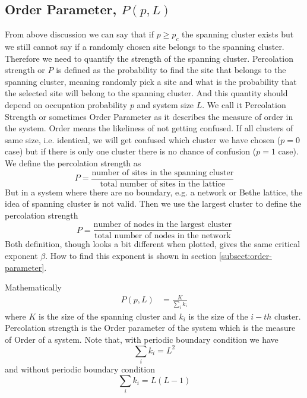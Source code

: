 	\subsection{Order Parameter, $P(p,L)$}
		From above discussion we can say that if $p\geq p_c$ the spanning cluster exists but we still cannot say if a randomly chosen site belongs to the spanning cluster. Therefore we need to quantify the strength of the spanning cluster. Percolation strength or $P$ is defined as the probability to find the site that belongs to the spanning cluster, meaning randomly pick a site and what is the probability that the selected site will belong to the spanning cluster. And this quantity should depend on occupation probability $p$ and system size $L$. We call it Percolation Strength or sometimes Order Parameter as it describes the measure of order in the system. Order means the likeliness of not getting confused. If all clusters of same size, i.e. identical, we will get confused which cluster we have chosen ($p=0$ case) but if there is only one cluster there is no chance of confusion ($p=1$ case).\\
		We define the percolation strength as
		\begin{equation}
			P = \frac{\text{number of sites in the spanning cluster}}{\text{total number of sites in the lattice}}
		\end{equation}
		But in a system where there are no boundary, e.g. a network or Bethe lattice, the idea of spanning cluster is not valid. Then we use the largest cluster to define the percolation strength
		\begin{equation}
			P = \frac{\text{number of nodes in the largest cluster}}{\text{total number of nodes in the network}}
		\end{equation}
		Both definition, though looks a bit different when plotted, gives the same critical exponent $\beta$. How to find this exponent is shown in section \ref{subsect:order-parameter}.
		
	    Mathematically
		\begin{align}
			P(p,L) &= \frac{K}{\sum_{i} k_i}
			\label{def:order-parameter}
		\end{align}
		where $K$ is the size of the spanning cluster and $k_i$ is the size of the $i-th$ cluster.
		Percolation strength is the Order parameter of the system which is the measure of Order of a system.
		Note that, with periodic boundary condition we have
		\begin{equation}
			\sum_{i} k_i = L^2
		\end{equation}
		and without periodic boundary condition
		\begin{equation}
			\sum_{i} k_i = L(L-1)
		\end{equation}
		
